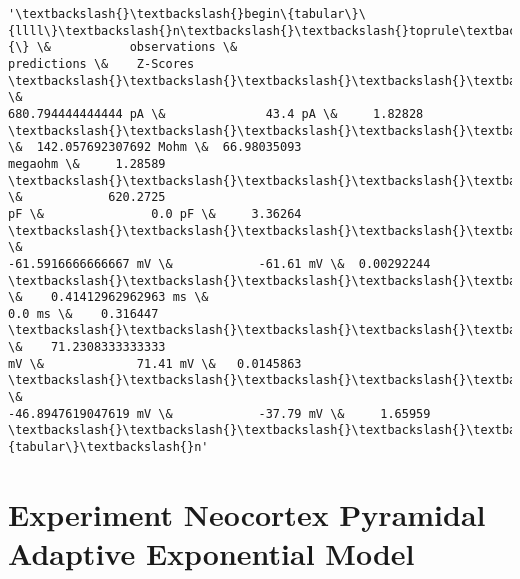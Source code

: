             \begin{tcolorbox}[breakable, size=fbox, boxrule=.5pt, pad at break*=1mm, opacityfill=0]
\begin{Verbatim}[commandchars=\\\{\}]
'\textbackslash{}\textbackslash{}begin\{tabular\}\{llll\}\textbackslash{}n\textbackslash{}\textbackslash{}toprule\textbackslash{}n\{\} \&           observations \&
predictions \&    Z-Scores \textbackslash{}\textbackslash{}\textbackslash{}\textbackslash{}\textbackslash{}n\textbackslash{}\textbackslash{}midrule\textbackslash{}nRheobaseTest                   \&
680.794444444444 pA \&              43.4 pA \&     1.82828
\textbackslash{}\textbackslash{}\textbackslash{}\textbackslash{}\textbackslash{}nInputResistanceTest            \&  142.057692307692 Mohm \&  66.98035093
megaohm \&     1.28589 \textbackslash{}\textbackslash{}\textbackslash{}\textbackslash{}\textbackslash{}nCapacitanceTest                \&            620.2725
pF \&               0.0 pF \&     3.36264 \textbackslash{}\textbackslash{}\textbackslash{}\textbackslash{}\textbackslash{}nRestingPotentialTest           \&
-61.5916666666667 mV \&            -61.61 mV \&  0.00292244
\textbackslash{}\textbackslash{}\textbackslash{}\textbackslash{}\textbackslash{}nInjectedCurrentAPWidthTest     \&    0.41412962962963 ms \&
0.0 ms \&    0.316447 \textbackslash{}\textbackslash{}\textbackslash{}\textbackslash{}\textbackslash{}nInjectedCurrentAPAmplitudeTest \&    71.2308333333333
mV \&             71.41 mV \&   0.0145863 \textbackslash{}\textbackslash{}\textbackslash{}\textbackslash{}\textbackslash{}nInjectedCurrentAPThresholdTest \&
-46.8947619047619 mV \&            -37.79 mV \&     1.65959
\textbackslash{}\textbackslash{}\textbackslash{}\textbackslash{}\textbackslash{}n\textbackslash{}\textbackslash{}bottomrule\textbackslash{}n\textbackslash{}\textbackslash{}end\{tabular\}\textbackslash{}n'
\end{Verbatim}
\end{tcolorbox}
        
    \hypertarget{experiment-neocortex-pyramidal-adaptive-exponential-model}{%
\section{Experiment Neocortex Pyramidal Adaptive Exponential
Model}\label{experiment-neocortex-pyramidal-adaptive-exponential-model}}



